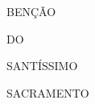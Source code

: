 \documentclass[a5paper,12pt,oneside,openany]{scrbook}
\begin{document}

\begin{titlepage}
\begin{center}
\vspace*{\fill}
{\huge BENÇÃO\par}
{\large DO\par}
{\Large SANTÍSSIMO\par}
{\huge SACRAMENTO\par}
\vspace*{\fill}
\end{center}
\end{titlepage}


\sloppy%


\setlength{\columnseprule}{0pt}
\setlength{\columnsep}{3mm}


\end{document}
